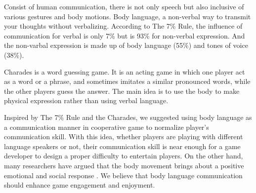 Consist of human communication, there is not only speech but also inclusive of various gestures and body motions. Body language, a non-verbal way to transmit your thoughts without verbalizing. According to The 7\% Rule\cite{GD2}, the influence of communication for verbal is only 7\% but is 93\% for non-verbal expression. And the non-varbal expression is made up of body language (55\%) and tones of voice (38\%).


Charades\cite{GD3} is a word guessing game. It is an acting game in which one player act as a word or a phrase, and sometimes imitates a similar pronounced words, while the other players guess the answer. The main idea is to use the body to make physical expression rather than using verbal language. 


Inspired by The 7\% Rule and the Charades, we suggested using body language as a communication manner in cooperative game to normalize player's communication skill. With this idea, whether players are playing with different language speakers or not, their communication skill is near enough for a game developer to design a proper difficulty to entertain players. On the other hand, many researchers have argued that the body movement brings about a positive emotional and social response \cite{GD7, GD8, GD9}. We believe that body language communication should enhance game engagement and enjoyment.
